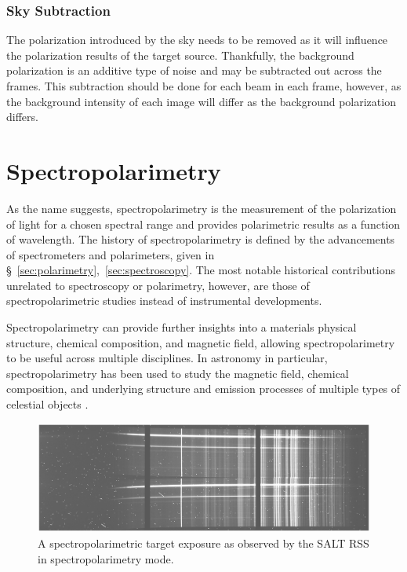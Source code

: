 \subsubsection{Sky Subtraction}\label{subsubsec:pol_sky_subtract}

The polarization introduced by the sky needs to be removed as it will influence the polarization results of the target source. Thankfully, the background polarization is an additive type of noise and may be subtracted out across the frames. This subtraction should be done for each beam in each frame, however, as the background intensity of each image will differ as the background polarization differs.


\section{Spectropolarimetry} \label{sec:spectropolarimetry} %

As the name suggests, spectropolarimetry is the measurement of the polarization of light for a chosen spectral range and provides polarimetric results as a function of wavelength. The history of spectropolarimetry is defined by the advancements of spectrometers and polarimeters, given in \S~\ref{sec:polarimetry},~\ref{sec:spectroscopy}. The most notable historical contributions unrelated to spectroscopy or polarimetry, however, are those of spectropolarimetric studies instead of instrumental developments.
\prgph

Spectropolarimetry can provide further insights into a materials physical structure, chemical composition, and magnetic field, allowing spectropolarimetry to be useful across multiple disciplines. In astronomy in particular, spectropolarimetry has been used to study the magnetic field, chemical composition, and underlying structure and emission processes of multiple types of celestial objects \citep[see for example][]{specpol_AGN, specpol_stars, specpol_SN}.
\prgph

\begin{figure}[t]
  \centering
  \includegraphics[width=1.0\textwidth]{figures/2_specpol_sci.pdf}
  \caption{A spectropolarimetric target exposure as observed by the \gls{SALT} \gls{RSS} in spectropolarimetry mode.}
  \label{fig:specpol_exp}
\end{figure}

